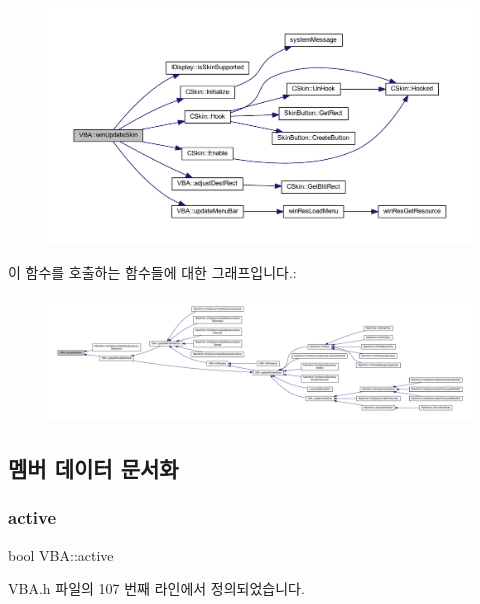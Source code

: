 \begin{figure}[H]
\begin{center}
\leavevmode
\includegraphics[width=350pt]{class_v_b_a_a4648998e25679df69b15afdccb428b8f_cgraph}
\end{center}
\end{figure}
이 함수를 호출하는 함수들에 대한 그래프입니다.\+:
\nopagebreak
\begin{figure}[H]
\begin{center}
\leavevmode
\includegraphics[width=350pt]{class_v_b_a_a4648998e25679df69b15afdccb428b8f_icgraph}
\end{center}
\end{figure}


\subsection{멤버 데이터 문서화}
\mbox{\label{class_v_b_a_ad3d55365d59a78eb24711c594eeb3b2b}} 
\subsubsection{\texorpdfstring{active}{active}}
{\footnotesize\ttfamily bool V\+B\+A\+::active}



V\+B\+A.\+h 파일의 107 번째 라인에서 정의되었습니다.

